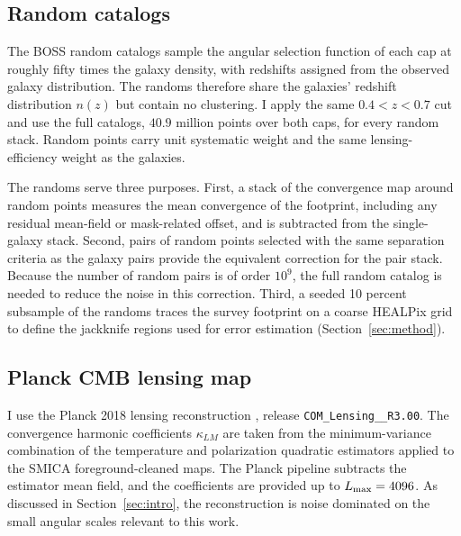 \documentclass[11pt,letterpaper]{article}
\begin{document}
\subsection{Random catalogs}
\label{sec:data_random}

The BOSS random catalogs \citep{Reid2016} sample the angular selection
function of each cap at roughly fifty times the galaxy density, with
redshifts assigned from the observed galaxy distribution. The randoms
therefore share the galaxies' redshift distribution $n(z)$ but contain no clustering. I apply the
same $0.4<z<0.7$ cut and use the full catalogs, $40.9$ million points over
both caps, for every random stack. 
Random points carry unit systematic weight and the same lensing-efficiency
weight as the galaxies.

The randoms serve three purposes. First, a stack of the convergence map
around random points measures the mean convergence of the footprint,
including any residual mean-field or mask-related offset, and is subtracted
from the single-galaxy stack. Second, pairs of random points selected with
the same separation criteria as the galaxy pairs provide the equivalent
correction for the pair stack. Because the number of random pairs is of
order $10^{9}$, the full random catalog is needed to reduce the noise in this
correction. Third, a seeded 10 percent subsample of the randoms traces the
survey footprint on a coarse HEALPix grid to define the jackknife regions
used for error estimation (Section~\ref{sec:method}).

\subsection{Planck CMB lensing map}
\label{sec:data_planck}

I use the Planck 2018 lensing reconstruction \citep{Planck2018lensing},
release \texttt{COM\_\allowbreak Lensing\_\_\allowbreak R3.00}. The convergence harmonic
coefficients $\kappa_{LM}$ are taken from the minimum-variance combination
of the temperature and polarization quadratic estimators applied to the
SMICA foreground-cleaned maps. The Planck pipeline subtracts the estimator
mean field, and the coefficients are provided up to
$L_{\rm max}=4096$. As discussed in Section~\ref{sec:intro}, the
reconstruction is noise dominated on the small angular scales relevant to
this work.
\end{document}
